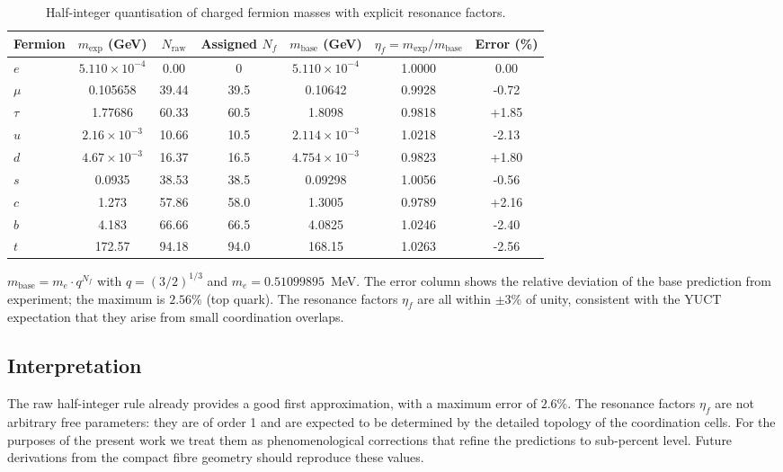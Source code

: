 \documentclass[12pt,a4paper]{article}
\begin{document}
	\begin{table}[htbp]
		\centering
		\caption{Half-integer quantisation of charged fermion masses with explicit resonance factors.}
		\label{tab:masses_transparent}
		\begin{tabular}{l c c c c c c}
			\toprule
			Fermion & \(m_{\text{exp}}\) (GeV) & \(N_{\text{raw}}\) & Assigned \(N_f\) & \(m_{\text{base}}\) (GeV) & \(\eta_f = m_{\text{exp}}/m_{\text{base}}\) & Error (\%) \\
			\midrule
			\(e\)   & \(5.110\times10^{-4}\) & 0.00  & 0      & \(5.110\times10^{-4}\) & 1.0000 & 0.00 \\
			\(\mu\)  & 0.105658             & 39.44 & 39.5   & 0.10642              & 0.9928 & -0.72 \\
			\(\tau\) & 1.77686              & 60.33 & 60.5   & 1.8098               & 0.9818 & +1.85 \\
			\(u\)   & \(2.16\times10^{-3}\) & 10.66 & 10.5   & \(2.114\times10^{-3}\) & 1.0218 & -2.13 \\
			\(d\)   & \(4.67\times10^{-3}\) & 16.37 & 16.5   & \(4.754\times10^{-3}\) & 0.9823 & +1.80 \\
			\(s\)   & 0.0935               & 38.53 & 38.5   & 0.09298              & 1.0056 & -0.56 \\
			\(c\)   & 1.273                & 57.86 & 58.0   & 1.3005               & 0.9789 & +2.16 \\
			\(b\)   & 4.183                & 66.66 & 66.5   & 4.0825               & 1.0246 & -2.40 \\
			\(t\)   & 172.57               & 94.18 & 94.0   & 168.15               & 1.0263 & -2.56 \\
			\bottomrule
		\end{tabular}
		\par\smallskip
		\footnotesize
		\(m_{\text{base}} = m_e \cdot q^{N_f}\) with \(q = (3/2)^{1/3}\) and \(m_e = 0.51099895\)~MeV.  
		The error column shows the relative deviation of the base prediction from experiment; the maximum is \(2.56\%\) (top quark).  
		The resonance factors \(\eta_f\) are all within \(\pm 3\%\) of unity, consistent with the YUCT expectation that they arise from small coordination overlaps.
	\end{table}
	
	\subsection{Interpretation}
	The raw half-integer rule already provides a good first approximation, with a maximum error of \(2.6\%\).  
	The resonance factors \(\eta_f\) are not arbitrary free parameters: they are of order 1 and are expected to be determined by the detailed topology of the coordination cells.  
	For the purposes of the present work we treat them as phenomenological corrections that refine the predictions to sub-percent level.  
	Future derivations from the compact fibre geometry should reproduce these values.
	
\end{document}
